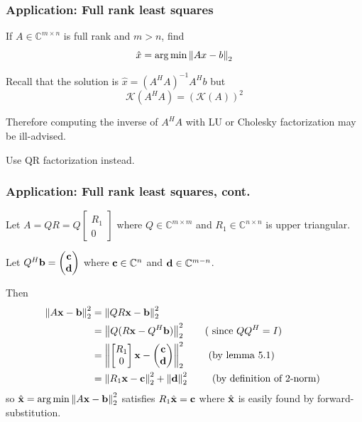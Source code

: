 \documentclass{beamer}
\begin{document}
\begin{frame}\frametitle{Application: Full rank least squares}
	If $A \in \mathbb{C}^{m\times n}$ is full rank and $m > n$, find 
	\[ \hat{x} = \arg\min\left\|Ax-b \right\|_2 \]
	
	\vfill
	
	Recall that the solution is $\hat{x} = (A^HA)^{-1}A^Hb$ but
	\[ \mathcal{K}(A^HA) = (\mathcal{K}(A))^2 \]
	
	Therefore computing the inverse of $A^HA$ with LU or Cholesky factorization may be ill-advised. 
	
	\vfill
	
	Use QR factorization instead.
	
\end{frame}

\begin{frame}\frametitle{Application: Full rank least squares, cont.}

	Let $A=QR=Q\begin{bmatrix} R_1 \\ 0 \end{bmatrix}$ where $Q\in\mathbb{C}^{m\times m}$ and $R_1\in\mathbb{C}^{n\times n}$ is upper triangular.
	
	\vfill
	
	Let $Q^H\mathbf{b} = \begin{pmatrix}\mathbf{c}\\\mathbf{d}\end{pmatrix}$ where $\mathbf{c}\in\mathbb{C}^n$ and $\mathbf{d}\in\mathbb{C}^{m-n}$.
	
	Then 
	\begin{align*}
	 \left\|A\mathbf{x} - \mathbf{b} \right\|_2^2 &= \left\|QR\mathbf{x} - \mathbf{b} \right\|_2^2 \\
	&= \left\|Q(R\mathbf{x}-Q^H\mathbf{b}) \right\|_2^2 \qquad \text{( since $QQ^H = I$)} \\
	&= \left\|\begin{bmatrix} R_1 \\ 0 \end{bmatrix}\mathbf{x} - \begin{pmatrix}\mathbf{c}\\\mathbf{d}\end{pmatrix} \right\|_2^2 \qquad \text{ (by lemma 5.1) }\\
	&= \left\|R_1\mathbf{x} - \mathbf{c} \right\|_2^2 + \left\|\mathbf{d}\right\|_2^2 \qquad \text{ (by definition of 2-norm) }
	\end{align*}
	so $\hat{\mathbf{x}} = \arg\min \left\|A\mathbf{x}-\mathbf{b} \right\|_2^2$ satisfies $R_1\hat{\mathbf{x}} = \mathbf{c}$ where $\hat{\mathbf{x}}$ is easily found by forward-substitution.	
\end{frame}
\end{document}
